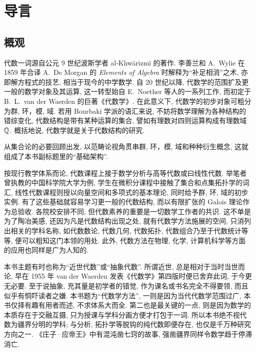 
\chapter*{导言}	%

\section*{概观}
代数一词源自公元 9 世纪波斯学者 al-Khwārizmī 的著作. 李善兰和 A.\ Wylie 在 1859 年合译 A.\ De Morgan 的 \textit{Elements of Algebra} 时解释为``补足相消''之术, 亦即解方程式的技艺, 相当于现今的中学数学. 自 20 世纪以降, 代数学的范围扩及更一般的数学对象及其运算, 这一转型始自 E.\ Noether 等人的一系列工作, 而初定于 B.\ L.\ van der Waerden 的巨著《代数学》\cite{vdW1, vdW2}. 在此意义下, 代数学的初步对象可粗分为群, 环，模, 域. 若用 Bourbaki 学派的语汇来说, 不妨将数学理解为各种结构的错综变化, 代数结构是带有某种运算的集合, 譬如有理数对四则运算构成有理数域 $\mathbb{Q}$. 概括地说, 代数学就是关于代数结构的研究.

从集合论的必要回顾出发, 以范畴论视角贯串群, 环，模, 域和种种衍生概念, 这就组成了本书副标题里的``基础架构''.

按现行教学体系而论, 代数课程上接于数学分析与高等代数或曰线性代数. 举笔者曾执教的中国科学院大学为例, 学生在微积分课程中接触了集合和点集拓扑学的词汇, 线性代数课程则授以向量空间和多项式的基本理论, 同时给予群, 环, 域的初步实例. 有了这些基础就容易学习更一般的代数结构, 而以有限扩张的 Galois 理论作为总验收. 各院校安排不同, 但代数素养的重要是一切数学工作者的共识. 这不单是为了陶冶美感, 还因为凡是代数结构出现之处, 就有代数学方法施展的空间, 只消列出相关的学科名称, 如代数数论, 代数几何, 代数拓扑, 代数组合乃至于代数统计等等, 便可以粗知这门本领的用处. 此外, 代数方法在物理, 化学, 计算机科学等方面的应用也同样是广为人知的.

本书主题有时也称为``近世代数''或``抽象代数''. 所谓近世, 总是相对于当时当世而论, 早在 1955 年 van der Waerden 发表《代数学》第四版时便已舍弃此词, 于今更无必要. 至于说抽象, 充其量是初学者的错觉, 作为课名或书名完全不得要领, 而且似乎有恫吓读者之嫌. 本书题为``代数学方法'', 一则是因为当代代数学范围过广, 本书仅择有趣有用者而述, 不求体系大而全. 第二也是最关键的一点, 则是因为数学的本质存在于交融互摄, 只为授课与学科分画方便才打包于一词. 所以本书绝不视代数为疆界分明的学科; 与分析, 拓扑学等脱钩的纯代数即便存在, 也仅是千万种研究方向之一. 《庄子·应帝王》中有混沌凿七窍的故事, 强凿疆界同样令数学趋于停滞消亡.

